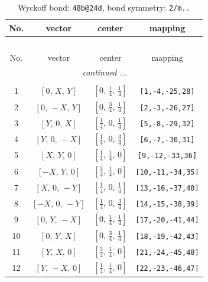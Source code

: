 \documentclass[fleqn,8pt]{jsarticle}
\begin{document}
\begin{longtable}{cccc}
\caption{Wyckoff bond: {\tt 48b@24d}, bond symmetry: {\tt 2/m..}}
 \\
 \hline \hline
No. & vector & center & mapping \\ \hline \endfirsthead

\multicolumn{3}{l}{\tablename\ \thetable{}} \\
 \hline \hline
No. & vector & center & mapping \\ \hline \endhead

 \hline \hline
\multicolumn{3}{r}{\footnotesize\it continued ...} \\ \endfoot

 \hline \hline
\multicolumn{3}{r}{} \\ \endlastfoot

1 & $\left[ 0,\, X,\, Y \right]$ & $\left[ 0,\, \frac{1}{4},\, \frac{1}{4} \right]$ & {\tt [1,-4,-25,28]} \\ \hline
2 & $\left[ 0,\, - X,\, Y \right]$ & $\left[ 0,\, \frac{3}{4},\, \frac{1}{4} \right]$ & {\tt [2,-3,-26,27]} \\ \hline
3 & $\left[ Y,\, 0,\, X \right]$ & $\left[ \frac{1}{4},\, 0,\, \frac{1}{4} \right]$ & {\tt [5,-8,-29,32]} \\ \hline
4 & $\left[ Y,\, 0,\, - X \right]$ & $\left[ \frac{1}{4},\, 0,\, \frac{3}{4} \right]$ & {\tt [6,-7,-30,31]} \\ \hline
5 & $\left[ X,\, Y,\, 0 \right]$ & $\left[ \frac{1}{4},\, \frac{1}{4},\, 0 \right]$ & {\tt [9,-12,-33,36]} \\ \hline
6 & $\left[ - X,\, Y,\, 0 \right]$ & $\left[ \frac{3}{4},\, \frac{1}{4},\, 0 \right]$ & {\tt [10,-11,-34,35]} \\ \hline
7 & $\left[ X,\, 0,\, - Y \right]$ & $\left[ \frac{1}{4},\, 0,\, \frac{1}{4} \right]$ & {\tt [13,-16,-37,40]} \\ \hline
8 & $\left[ - X,\, 0,\, - Y \right]$ & $\left[ \frac{1}{4},\, 0,\, \frac{3}{4} \right]$ & {\tt [14,-15,-38,39]} \\ \hline
9 & $\left[ 0,\, Y,\, - X \right]$ & $\left[ 0,\, \frac{1}{4},\, \frac{1}{4} \right]$ & {\tt [17,-20,-41,44]} \\ \hline
10 & $\left[ 0,\, Y,\, X \right]$ & $\left[ 0,\, \frac{3}{4},\, \frac{1}{4} \right]$ & {\tt [18,-19,-42,43]} \\ \hline
11 & $\left[ Y,\, X,\, 0 \right]$ & $\left[ \frac{3}{4},\, \frac{1}{4},\, 0 \right]$ & {\tt [21,-24,-45,48]} \\ \hline
12 & $\left[ Y,\, - X,\, 0 \right]$ & $\left[ \frac{1}{4},\, \frac{1}{4},\, 0 \right]$ & {\tt [22,-23,-46,47]} \\
\end{longtable}
\end{document}
